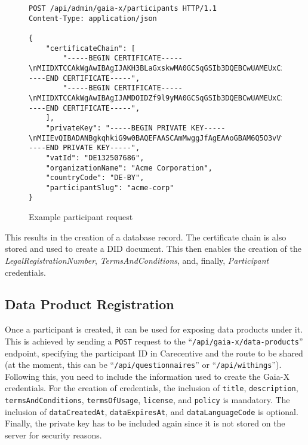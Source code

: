 \begin{figure}
    \centering
    \begin{verbatim}
POST /api/admin/gaia-x/participants HTTP/1.1
Content-Type: application/json

{
	"certificateChain": [
		"-----BEGIN CERTIFICATE-----\nMIIDXTCCAkWgAwIBAgIJAKH3BLaGxskwMA0GCSqGSIb3DQEBCwUAMEUxCzAJBgNV\n...\nJmCVzwB/MCuv3z4IV0IsbP5ZKh+6m0oI+RINdDl4Stxdj6LK8JspNeU0R6mBg1A=\n-----END CERTIFICATE-----",
		"-----BEGIN CERTIFICATE-----\nMIIDXTCCAkWgAwIBAgIJAMDOIDZf9l9yMA0GCSqGSIb3DQEBCwUAMEUxCzAJBgNV\n...\nv5pXVIlZm8DtRmDTUp8pNDnQ5UAZTuDPaWo3zbxZPOUmGJ1IlBOgaQvsyPCW5gU=\n-----END CERTIFICATE-----",
	],
	"privateKey": "-----BEGIN PRIVATE KEY-----\nMIIEvQIBADANBgkqhkiG9w0BAQEFAASCAmMwggJfAgEAAoGBAM6Q5O3vVfnxk6P7\n...\nYWw+HiFJh9XQpRUtv9PV8L8AqFFfMdsOpT6pgC+aA/WB\n-----END PRIVATE KEY-----",
	"vatId": "DE132507686",
	"organizationName": "Acme Corporation",
	"countryCode": "DE-BY",
	"participantSlug": "acme-corp"
}
    \end{verbatim}
    \caption{Example participant request}\label{fig:participant_req}
\end{figure}

This results in the creation of a database record.
The certificate chain is also stored and used to create a DID document.
This then enables the creation of the \textit{LegalRegistrationNumber}, \textit{TermsAndConditions}, and, finally, \textit{Participant} credentials.

\subsection{Data Product Registration}\label{subsec:data-product-registration}

Once a participant is created, it can be used for exposing data products under it.
This is achieved by sending a \texttt{POST} request to the ``\texttt{/api/gaia-x/data-products}'' endpoint, specifying the participant ID in Carecentive and the route to be shared (at the moment, this can be ``\texttt{/api/questionnaires}'' or ``\texttt{/api/withings}'').
Following this, you need to include the information used to create the Gaia-X credentials.
For the creation of credentials, the inclusion of \texttt{title}, \texttt{description}, \texttt{termsAndConditions}, \texttt{termsOfUsage}, \texttt{license}, and \texttt{policy} is mandatory.
The inclusion of \texttt{dataCreatedAt}, \texttt{dataExpiresAt}, and \texttt{dataLanguageCode} is optional.
Finally, the private key has to be included again since it is not stored on the server for security reasons.

